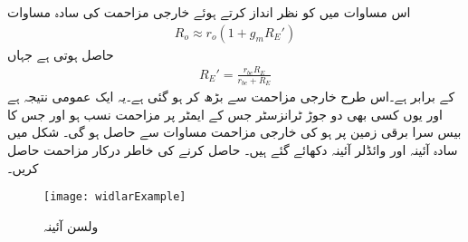 اس مساوات میں  کو نظر انداز کرتے ہوئے خارجی مزاحمت  کی سادہ مساوات
\begin{align}\label{مساوات_تفرقی_قابو_زمین_مخارج_مزاحمت_خارجی_مزاحمت}
R_o\approx r_o\left(1+g_m R_E' \right)
\end{align}
حاصل ہوتی ہے جہاں
\begin{align}\label{مساوات_تفرقی_قابو_زمین_مخارج_مزاحمت_خارجی_مزاحمت_الف}
R_E'=\frac{r_{be} R_E}{r_{be}+R_E}
\end{align}
کے برابر ہے۔اس طرح خارجی مزاحمت  سے بڑھ کر  ہو گئی ہے۔یہ ایک عمومی نتیجہ ہے اور یوں کسی بھی دو جوڑ ٹرانزسٹر جس کے ایمٹر پر  مزاحمت نسب ہو اور جس کا بیس سرا برقی زمین پر ہو کی خارجی مزاحمت مساوات  سے حاصل ہو گی۔
شکل  میں سادہ آئینہ اور وائڈلر آئینہ دکھائے گئے ہیں۔ حاصل کرنے کی خاطر درکار مزاحمت حاصل کریں۔

\begin{figure}
\centering
\texttt{[image: widlarExample]}
\caption{ولسن آئینہ}
\label{شکل_تفرقی_وائڈلر_آئینہ_مثال}
\end{figure}

